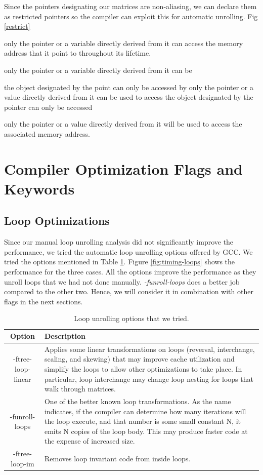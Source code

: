 \documentclass{article}
\begin{document}
Since the pointers designating our matrices are non-aliasing, we can declare them as restricted pointers so the compiler can exploit this for automatic unrolling. Fig \ref{restrict}

 

only the pointer or a variable directly derived from it can access the memory address that it point to throughout its lifetime.

 only the pointer or a variable directly derived from it can be 

the object designated by the point can only be accessed by only the pointer or a value directly derived from it can be used to access the object designated by the pointer can only be accessed 


 only the pointer or a value directly derived from it will be used to access the associated memory address.  

\section{Compiler Optimization Flags and Keywords}

\subsection{Loop Optimizations}

Since our manual loop unrolling analysis did not significantly improve the performance, we tried the automatic loop unrolling options offered by GCC. We tried the options mentioned in Table \ref{loop-unrolling}. Figure \ref{fig:timing-loops} shows the performance for the three cases. All the options improve the performance as they unroll loops that we had not done manually. \textit{-funroll-loops} does a better job compared to the other two. Hence, we will consider it in combination with other flags in the next sections.


\begin{table}
\begin{center}
    \begin{tabular}{ | c | p{10cm} |}
    \hline
    Option & Description \\ \hline
    -ftree-loop-linear  & Applies some linear transformations on loops (reversal, interchange, scaling, and skewing) that may improve cache utilization and simplify the loops to allow other optimizations to take place. In particular, loop interchange may change loop nesting for loops that walk through matrices. \\ \hline
    -funroll-loops &  One of the better known loop transformations. As the name indicates, if the compiler can determine how many iterations will the loop execute, and that number is some small constant N, it emits N copies of the loop body. This may produce faster code at the expense of increased size. \\
    \hline
    -ftree-loop-im & Removes loop invariant code from inside loops. \\ \hline
    \end{tabular}
    \caption{Loop unrolling options that we tried.}
    \label{loop-unrolling}
\end{center}
\end{table}
\end{document}
